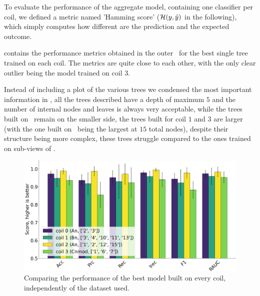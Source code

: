 To evaluate the performance of the aggregate model, containing one classifier per coil, we defined a
metric named 'Hamming score' ($\mathcal{H}(y, \hat{y})$ in the following), which simply computes how different are the
prediction and the expected outcome.

 contains the performance metrics obtained in the outer \cv\ for the best single
tree trained on each coil. The metrics are quite close to each other, with the only clear outlier
being the model trained on coil $3$.

Instead of including a plot of the various trees we condensed the most important information
in , all the trees described have a depth of maximum $5$ and the number
of internal nodes and leaves is always very acceptable, while the trees built on \an\ remain on the
smaller side, the trees built for coil $1$ and $3$ are larger (with the one built on \cnmod\ being
the largest at $15$ total nodes), despite their structure being more complex, these trees struggle
compared to the ones trained on sub-views of \an.

\begin{figure}[!ht]
	\centering
	\includegraphics[width=\linewidth]{img/best_dts_qlp.png}
	\caption{Comparing the performance of the best model built on every coil, independently of
		the dataset used.} \label{fig:bdts-qlp}
\end{figure}

